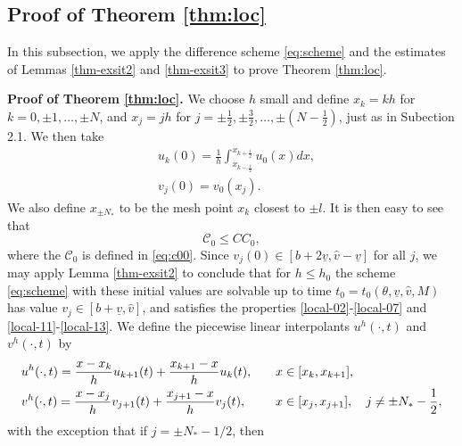 \documentclass[a4paper,oneside,11pt]{article}
\numberwithin{equation}{section}
\begin{document}
\subsection{Proof of Theorem \ref{thm:loc}}
\indent\qquad
In this subsection, we apply the difference scheme \eqref{eq:scheme} and the estimates of Lemmas \ref{thm-exsit2} and \ref{thm-exsit3} to prove Theorem \ref{thm:loc}. %

\noindent\textbf{Proof of Theorem \ref{thm:loc}.} We choose \(h\) small and define \(x_k=kh\) for \(k=0,\pm 1,\dots,\pm N\), and \(x_j=jh\) for \(j=\pm\frac12,\pm\frac32,\dots, \pm(N-\frac12)\), just as in Subection 2.1.  We then take
\[\begin{aligned}&u_{k}(0)=\frac{1}{h}\int_{x_{k-\frac{1}{2}}}^{x_{k+\frac{1}{2}}}u_{0}(x)dx,\\&v_j(0)=v_0(x_j).\end{aligned}\]
We also define \(x_{\pm N_*}\) to be the mesh point \(x_k\) closest to \(\pm l\). 
It is then easy to see that
\begin{equation}\label{eq:p31}
	\mathscr{C}_0\leq CC_0,%
\end{equation}
where the \(\mathscr{C}_{0}\) is defined in \eqref{eq:c00}. Since \(v_{j}(0)\in [b+2\underline{v},\hat{v}-\underline{v}]\) for all \(j\), we may apply Lemma \ref{thm-exsit2} to conclude that for \(h\leq h_{0}\) the scheme \eqref{eq:scheme} with these initial values are solvable up to time \(t_{0}=t_{0}(\theta, \underline{v},\hat{v}, M)\) has value \(v_{j}\in [b+\underline{v},\hat{v}]\), and satisfies the properties \eqref{local-02}-\eqref{local-07}
and \eqref{local-11}-\eqref{local-13}. 
We define the piecewise linear interpolants \(u^h(\cdot,t)\) and \(v^h(\cdot,t)\) by
\begin{equation*}
	\begin{aligned}
	\displaystyle  &u^h(\cdot,t)=\frac{x-x_k}{h}u_{k+1}(t)+\frac{x_{k+1}-x}{h}u_{k}(t),~~~&&x\in [x_k,x_{k+1}],\\
	&v^h(\cdot,t)=\frac{x-x_j}{h}v_{j+1}(t)+\frac{x_{j+1}-x}{h}v_{j}(t),~~~&&x\in [x_j,x_{j+1}],~~~j \neq \pm N_*-\frac12,
	\end{aligned}
\end{equation*}
with the exception that if \(j=\pm N_*-1/2\), then
\end{document}
